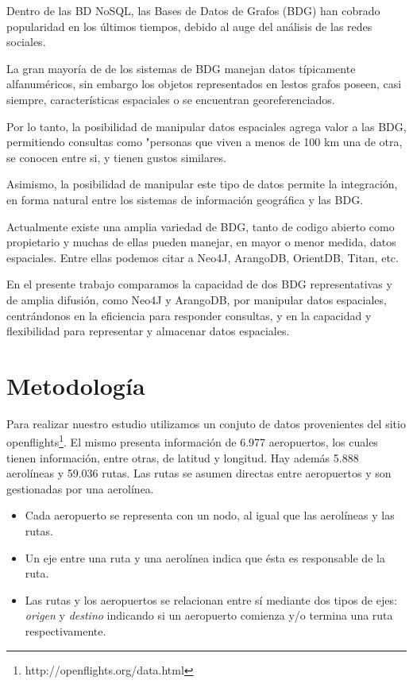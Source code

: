 \documentclass{llncs}
\begin{document}
Dentro de las BD NoSQL, las Bases de Datos de Grafos (BDG) han cobrado popularidad en los últimos tiempos, debido al auge del análisis de las redes sociales.

La gran mayoría de de los sistemas de BDG manejan datos típicamente alfanuméricos, sin embargo los objetos representados en lestos grafos poseen, casi siempre, características espaciales o se encuentran georeferenciados.

Por lo tanto, la posibilidad de manipular datos espaciales agrega valor a las BDG, permitiendo consultas como "personas que viven a menos de 100 km una de otra, se conocen entre si, y tienen gustos similares.

Asimismo, la posibilidad de manipular este tipo de datos permite la integración, en forma natural entre los sistemas de información geográfica y las BDG.

Actualmente existe una amplia variedad de BDG, tanto de codigo abierto como propietario y muchas de ellas pueden manejar, en mayor o menor medida, datos espaciales. Entre ellas podemos citar a Neo4J\cite{n4jsp}, ArangoDB\cite{adbgi}, OrientDB, Titan, etc.

En el presente trabajo comparamos la capacidad de dos BDG representativas y de amplia difusión, como Neo4J y ArangoDB, por manipular datos espaciales, centrándonos en la eficiencia para responder consultas, y en la capacidad y flexibilidad para representar y almacenar datos espaciales.

\section{Metodología}

Para realizar nuestro estudio utilizamos un conjuto de datos provenientes del sitio  openflights\footnote{http://openflights.org/data.html}. El mismo presenta información de 6.977 aeropuertos, los cuales tienen información, entre otras, de latitud y longitud. Hay además 5.888 aerolíneas y 59.036 rutas. Las rutas se asumen directas entre aeropuertos y son gestionadas por una aerolínea.

\begin{itemize}
\item Cada aeropuerto se representa con un nodo, al igual que las aerolíneas y las rutas.
\item Un eje entre una ruta y una aerolínea indica que ésta es responsable de la ruta.
\item Las rutas y los aeropuertos se relacionan entre sí mediante dos tipos de ejes: \textit{origen} y \textit{destino} indicando si un aeropuerto comienza y/o termina una ruta respectivamente.
\end{itemize}
\end{document}
